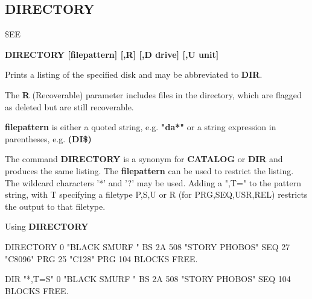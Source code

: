 \subsection{DIRECTORY}
\begin{description}[leftmargin=3cm,style=nextline]
\item [Token:] \$EE
\item [Format:] {\bf DIRECTORY [filepattern] [,R] [,D drive] [,U unit] }
\item [Usage:]
   Prints a listing
   of the specified disk and may be abbreviated to {\bf DIR}.

   The {\bf R} (Recoverable) parameter includes files in the
   directory, which are flagged as deleted but are still
   recoverable.

   {\bf filepattern} is either a quoted string, e.g. {\bf "da*"} or
   a string expression in parentheses, e.g. {\bf (DI\$)}

	 \drivedefinition

	 \unitdefinition

\item [Remarks:]
   The command {\bf DIRECTORY} is a synonym for {\bf CATALOG}
   or {\bf DIR} and produces the same listing.
   The {\bf filepattern} can be used to restrict the listing.
   The wildcard characters '*' and '?' may be used.
   Adding a ",T=" to the pattern string, with T specifying
   a filetype P,S,U or R (for PRG,SEQ,USR,REL) restricts the
   output to that filetype.

\item [Example:] Using {\bf DIRECTORY}
\begin{screenoutput}
DIRECTORY
  0 "BLACK SMURF     " BS  2A
508 "STORY PHOBOS"         SEQ
27  "C8096"                PRG
25  "C128"                 PRG
104 BLOCKS FREE.

DIR "*,T=S"
  0 "BLACK SMURF     " BS  2A
508 "STORY PHOBOS"         SEQ
104 BLOCKS FREE.
\end{screenoutput}
\end{description}


\newpage
